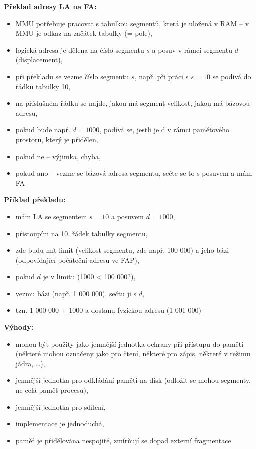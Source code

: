 \documentclass[a4paper, 11pt]{article}
\begin{document}
\textbf{Překlad adresy LA na FA:}
\begin{itemize}
    \item MMU potřebuje pracovat s tabulkou segmentů, která je uložená v RAM -- v MMU je odkaz na začátek tabulky (= pole),
    \item logická adresa je dělena na číslo segmentu $s$ a posuv v rámci segmentu $d$ (displacement),
    \item při překladu se vezme číslo segmentu $s$, např. při práci s $s=10$ se podívá do řádku tabulky 10,
    \item na příslušném řádku se najde, jakou má segment velikost, jakou má bázovou adresu,
    \item pokud bude např. $d=1000$, podívá se, jestli je d v rámci paměťového prostoru, který je přidělen,
    \item pokud ne -- výjimka, chyba,
    \item pokud ano -- vezme se bázová adresa segmentu, sečte se to s posuvem a mám FA
\end{itemize}

\textbf{Příklad překladu:}
\begin{itemize}
    \item mám LA se segmentem $s=10$ a posuvem $d=1000$,
    \item přistoupím na 10. řádek tabulky segmentu,
    \item zde budu mít limit (velikost segmentu, zde např. 100 000) a jeho bázi (odpovídající počáteční adresu ve FAP),
    \item pokud $d$ je v limitu (1000 < 100 000?),
    \item vezmu bázi (např. 1 000 000), sečtu ji s $d$,
    \item tzn. 1 000 000 + 1000 a dostanu fyzickou adresu (1 001 000)
\end{itemize}

\textbf{Výhody:}
\begin{itemize}
 \item mohou být použity jako jemnější jednotka ochrany při přístupu do paměti (některé mohou označeny jako pro čtení, některé pro zápis, některé v režimu jádra, \ldots),
 \item jemnější jednotka pro odkládání paměti na disk (odložit se mohou segmenty, ne celá paměť procesu),
 \item jemnější jednotka pro sdílení,
 \item implementace je jednoduchá,
 \item paměť je přidělována nespojitě, zmírňují se dopad externí fragmentace
\end{itemize}
\end{document}

